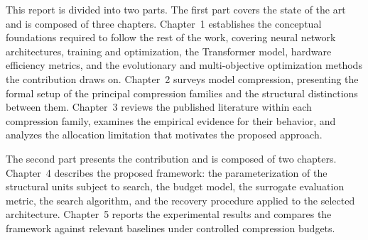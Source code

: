 This report is divided into two parts. The first part covers the state of the art
and is composed of three chapters. Chapter~1 establishes the conceptual foundations
required to follow the rest of the work, covering neural network architectures,
training and optimization, the Transformer model, hardware efficiency metrics,
and the evolutionary and multi-objective optimization methods the contribution draws on.
Chapter~2 surveys model compression, presenting the formal setup of the principal
compression families and the structural distinctions between them.
Chapter~3 reviews the published literature within each compression family,
examines the empirical evidence for their behavior, and analyzes the allocation
limitation that motivates the proposed approach.

The second part presents the contribution and is composed of two chapters.
Chapter~4 describes the proposed framework: the parameterization of the structural
units subject to search, the budget model, the surrogate evaluation metric,
the search algorithm, and the recovery procedure applied to the selected architecture.
Chapter~5 reports the experimental results and compares the framework against
relevant baselines under controlled compression budgets.

\clearpage
